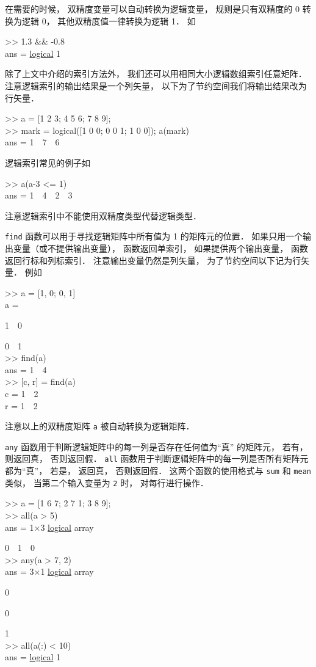 在需要的时候， 双精度变量可以自动转换为逻辑变量， 规则是只有双精度的 0 转换为逻辑 0， 其他双精度值一律转换为逻辑 1． 如
\begin{Command}
>> 1.3 \&\& -0.8 \\
ans = {\color{blue}\underline{logical}} 1
\end{Command}

除了上文中介绍的索引方法外， 我们还可以用相同大小逻辑数组索引任意矩阵． 注意逻辑索引的输出结果是一个列矢量， 以下为了节约空间我们将输出结果改为行矢量．
\begin{Command}
>> a = [1 2 3; 4 5 6; 7 8 9]; \\
>> mark = logical([1 0 0; 0 0 1; 1 0 0]); a(mark) \\
ans = 1\ \ 7\ \ 6
\end{Command}
逻辑索引常见的例子如
\begin{Command}
>> a(a-3 <= 1) \\
ans = 1\ \ 4\ \ 2\ \ 3
\end{Command}
注意逻辑索引中不能使用双精度类型代替逻辑类型．

\texttt{find} 函数可以用于寻找逻辑矩阵中所有值为 1 的矩阵元的位置． 如果只用一个输出变量（或不提供输出变量）， 函数返回单索引， 如果提供两个输出变量， 函数返回行标和列标索引． 注意输出变量仍然是列矢量， 为了节约空间以下记为行矢量． 例如
\begin{Command}
>> a = [1, 0; 0, 1]\\
a =\par
1\ \ 0\par
0\ \ 1\\
>> find(a)\\
ans = 1\ \ 4\\
>> [c, r] = find(a)\\
c = 1\ \ 2\\
r = 1\ \ 2
\end{Command}
注意以上的双精度矩阵 \texttt{a} 被自动转换为逻辑矩阵． 

\texttt{any} 函数用于判断逻辑矩阵中的每一列是否存在任何值为“真” 的矩阵元， 若有， 则返回真， 否则返回假． \texttt{all} 函数用于判断逻辑矩阵中的每一列是否所有矩阵元都为“真”， 若是， 返回真， 否则返回假． 这两个函数的使用格式与 \texttt{sum} 和 \texttt{mean} 类似， 当第二个输入变量为 \texttt{2} 时， 对每行进行操作．
\begin{Command}
>> a = [1 6 7; 2 7 1; 3 8 9];\\
>> all(a > 5)\\
ans = 1×3 {\color{blue}\underline{logical}} array\par
0\ \ 1\ \ 0\\
>> any(a > 7, 2)\\
ans = 3×1 {\color{blue}\underline{logical}} array\par
0\par 0\par 1\\
>> all(a(:) < 10)\\
ans = {\color{blue}\underline{logical}} 1
\end{Command}

